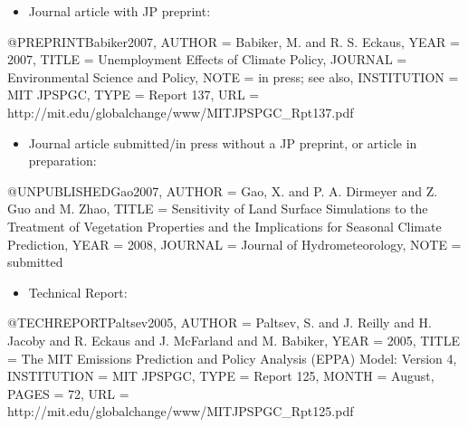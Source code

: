 \documentclass[12pt,fleqn]{article}
\let\oldverbatim\verbatim
\let\oldendverbatim\endverbatim
\renewenvironment{verbatim}{\endgraf\footnotesize\singlespace\oldverbatim}{\oldendverbatim\endsinglespace}
\begin{document}
\begin{itemize}
\item Journal article with JP preprint:
\end{itemize}
\begin{verbatim}
@PREPRINT{Babiker2007,
  AUTHOR = {Babiker, M. and R. S. Eckaus},
  YEAR = {2007},
  TITLE = {Unemployment Effects of Climate Policy},
  JOURNAL = {Environmental Science and Policy},
  NOTE = {in press; see also},
  INSTITUTION = {MIT JPSPGC},
  TYPE = {Report 137},
  URL = {http://mit.edu/globalchange/www/MITJPSPGC_Rpt137.pdf}}
\end{verbatim}

\begin{itemize}
\item Journal article submitted/in press without a JP preprint, or article in 
preparation:
\end{itemize}
\begin{verbatim}
@UNPUBLISHED{Gao2007,
  AUTHOR = {Gao, X. and P. A. Dirmeyer and Z. Guo and M. Zhao},
  TITLE = {Sensitivity of Land Surface Simulations to the Treatment of Vegetation
  Properties and the Implications for Seasonal Climate Prediction},
  YEAR = {2008},
  JOURNAL = {Journal of Hydrometeorology},
  NOTE = {submitted}}
\end{verbatim}


\begin{itemize}
\item Technical Report:
\end{itemize}
\begin{verbatim}
@TECHREPORT{Paltsev2005,
  AUTHOR = {Paltsev, S. and J. Reilly and H. Jacoby and R. Eckaus and
  J. McFarland and M. Babiker},
  YEAR = {2005},
  TITLE = {The MIT Emissions Prediction and Policy Analysis (EPPA) Model:
  Version 4},
  INSTITUTION = {MIT JPSPGC},
  TYPE = {Report 125},
  MONTH = {August},
  PAGES = {72},
  URL = {http://mit.edu/globalchange/www/MITJPSPGC_Rpt125.pdf}}
\end{verbatim}
\end{document}
